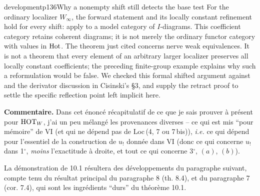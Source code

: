\begin{dcomment}{development}{p136}{Why a nonempty shift still detects the base test}
For the ordinary localizer $W_\infty$, the forward statement and its locally constant refinement hold for every shift: apply \citet[Theorem 1.3]{Cisinski2009LocallyConstant} to a model category of $I$-diagrams. This coefficient category retains coherent diagrams; it is not merely the ordinary functor category with values in $\mathrm{Hot}$. The theorem just cited concerns nerve weak equivalences. It is not a theorem that every element of an arbitrary larger localizer preserves all locally constant coefficients; the preceding finite-group example explains why such a reformulation would be false. We checked this formal shifted argument against \citet[Theorem 1.25]{Groth2013} and the derivator discussion in Cisinski's \S3, and supply the retract proof to settle the specific reflection point left implicit here.
\end{dcomment}


\textbf{Commentaire.} Dans cet énoncé récapitulatif de ce que je sais prouver à présent pour $\mathrm{HOT}_W$, j'ai un peu mélangé les provenances diverses – ce qui est mis “pour mémoire” de VI (et qui ne dépend pas de Loc\,(4, 7 ou 7\,bis)), \textit{i.e.} ce qui dépend pour l'essentiel de la construction de $u_!$ donnée dans VI (donc ce qui concerne $u_!$ dans 1$^{\circ}$, \textit{moins} l'exactitude à droite, et tout ce qui concerne 3$^{\circ}$, $(a)$, $(b)$).

La démonstration de 10.1 résultera des développements du paragraphe suivant, compte tenu du résultat principal du paragraphe 8 (th. 8.4), et du paragraphe 7 (cor. 7.4), qui sont les ingrédients “durs” du théorème 10.1.


